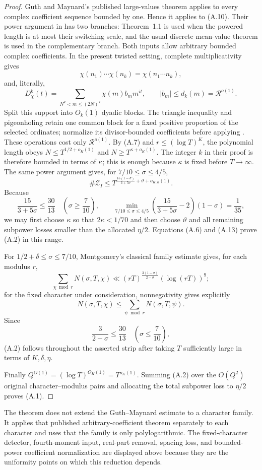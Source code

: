 \begin{proof}
Guth and Maynard's published large-values theorem \cite[Theorem~1.1]{GuthMaynard2026}
applies to every complex coefficient sequence bounded by one.  Hence it
applies to (A.10).  Their power argument in
\cite[Section~13.1]{GuthMaynard2026} has two branches: Theorem~1.1 is used
when the powered length is at most their switching scale, and the usual
discrete mean-value theorem is used in the complementary branch.  Both inputs
allow arbitrary bounded complex coefficients.  In the present twisted setting,
complete multiplicativity gives
\[
 \chi(n_1)\cdots\chi(n_k)=\chi(n_1\cdots n_k),
\]
and, literally,
\[
 D_\chi^k(t)=
 \sum_{N^k<m\le(2N)^k}\chi(m)b_m m^{it},
 \qquad |b_m|\le d_k(m)=\mathcal R^{o(1)}.
\]
Split this support into $O_k(1)$ dyadic blocks. The triangle inequality and
pigeonholing retain one common block for a fixed positive proportion of the
selected ordinates; normalize its divisor-bounded coefficients before
applying \cite[Theorem~1.1]{GuthMaynard2026}. These operations cost only
$\mathcal R^{o(1)}$. By (A.7) and $r\le(\log T)^K$, the polynomial length obeys
$N\le T^{1/2+o_K(1)}$ and $N\ge T^{\kappa+o_K(1)}$. The integer $k$ in
their proof is therefore bounded in terms of $\kappa$; this is enough because
$\kappa$ is fixed before $T\to\infty$. The same power argument gives, for
$7/10\le\sigma\le4/5$,
\[
 \#\mathcal Z_I
 \le T^{\frac{15(1-\sigma)}{3+5\sigma}
          +\vartheta+o_{K,\kappa}(1)}.
 \tag{A.13}
\]
Because
\[
 \frac{15}{3+5\sigma}\le\frac{30}{13}
 \quad\left(\sigma\ge\frac7{10}\right),
 \qquad
 \min_{7/10\le\sigma\le4/5}
 \left(\frac{15}{3+5\sigma}-2\right)(1-\sigma)
 =\frac1{35},
\]
we may first choose $\kappa$ so that $2\kappa<1/70$ and then choose
$\vartheta$ and all remaining subpower losses smaller than the allocated
$\eta/2$. Equations (A.6) and (A.13) prove (A.2) in this range.

For $1/2+\delta\le\sigma\le7/10$, Montgomery's classical family estimate
\cite[Theorem~12.1]{Montgomery1971} gives, for each modulus $r$,
\[
 \sum_{\chi\bmod r}N(\sigma,T,\chi)
 \ll (rT)^{\frac{3(1-\sigma)}{2-\sigma}}
       (\log(rT))^9;
 \tag{A.14}
\]
for the fixed character under consideration, nonnegativity gives explicitly
\[
 N(\sigma,T,\chi)
 \le \sum_{\psi\bmod r}N(\sigma,T,\psi).
\]
Since
\[
 \frac3{2-\sigma}\le\frac{30}{13}
 \quad\left(\sigma\le\frac7{10}\right),
\]
(A.2) follows throughout the asserted strip after taking $T$ sufficiently
large in terms of $K,\delta,\eta$.

Finally $Q^{O(1)}=(\log T)^{O_K(1)}=T^{o_K(1)}$.  Summing (A.2) over the
$O(Q^2)$ original character--modulus pairs and allocating the total subpower
loss to $\eta/2$ proves (A.1).
\end{proof}

\begin{remark}
The theorem does not extend the Guth--Maynard estimate to a character family.
It applies that published arbitrary-coefficient theorem separately to each
character and uses that the family is only polylogarithmic. The fixed-character
detector, fourth-moment input, real-part removal, spacing loss, and bounded-power
coefficient normalization are displayed above because they are the uniformity
points on which this reduction depends.
\end{remark}
